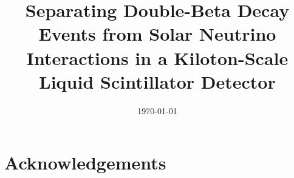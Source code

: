 



\graphicspath{{figs/}}

\linenumbers
{}
%

\title{Separating Double-Beta Decay Events from Solar Neutrino Interactions in a Kiloton-Scale Liquid Scintillator Detector}


\begin{abstract}

\end{abstract}

\date{\today}

\maketitle

\newpage
\tableofcontents
\newpage

\linenumbers\relax %




\clearpage %

\clearpage %


\clearpage %


\clearpage %


\clearpage %

\section*{Acknowledgements}



%




